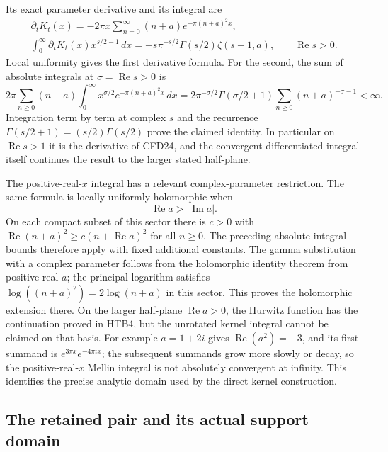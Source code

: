 \documentclass[11pt]{article}
\theoremstyle{definition}
\begin{document}
Its exact parameter derivative and its integral are
\begin{equation}\tag{CFD25}
\begin{gathered}
 \partial_tK_t(x)
     =-2\pi x\sum_{n=0}^{\infty}(n+a)e^{-\pi(n+a)^2x},\\
 \int_0^\infty \partial_tK_t(x)x^{s/2-1}\,dx
     =-s\pi^{-s/2}\Gamma(s/2)\zeta(s+1,a),
                     \qquad\operatorname{Re}s>0.
\end{gathered}
\end{equation}
Local uniformity gives the first derivative formula. For the second,
the sum of absolute integrals at $\sigma=\operatorname{Re}s>0$ is
\[
 2\pi\sum_{n\ge0}(n+a)
 \int_0^\infty x^{\sigma/2}e^{-\pi(n+a)^2x}\,dx
 =2\pi^{-\sigma/2}\Gamma(\sigma/2+1)
       \sum_{n\ge0}(n+a)^{-\sigma-1}<\infty.
\]
Integration term by term at complex $s$ and the recurrence
$\Gamma(s/2+1)=(s/2)\Gamma(s/2)$ prove the claimed identity.
In particular on $\operatorname{Re}s>1$ it is the derivative
of CFD24, and the convergent differentiated integral itself
continues the result to the larger stated half-plane.

The positive-real-$x$ integral has a relevant complex-parameter
restriction. The same formula is locally uniformly holomorphic
when
\begin{equation}\tag{CFD26}
 \operatorname{Re}a>|\operatorname{Im}a|.
\end{equation}
On each compact subset of this sector there is $c>0$ with
$\operatorname{Re}(n+a)^2\ge c(n+\operatorname{Re}a)^2$ for all
$n\ge0$. The preceding absolute-integral bounds therefore apply
with fixed additional constants. The gamma substitution with a
complex parameter follows from the holomorphic identity theorem
from positive real $a$; the principal logarithm satisfies
$\log((n+a)^2)=2\log(n+a)$ in this sector. This proves the
holomorphic extension there. On the larger half-plane
$\operatorname{Re}a>0$, the Hurwitz function has the continuation
proved in HTB4, but the unrotated kernel integral cannot be claimed
on that basis. For example $a=1+2i$ gives
$\operatorname{Re}(a^2)=-3$, and its first summand is
$e^{3\pi x}e^{-4\pi i x}$; the subsequent summands grow more
slowly or decay, so the positive-real-$x$ Mellin integral is not
absolutely convergent at infinity. This identifies the precise
analytic domain used by the direct kernel construction.

\subsection{The retained pair and its actual support domain}
\end{document}
